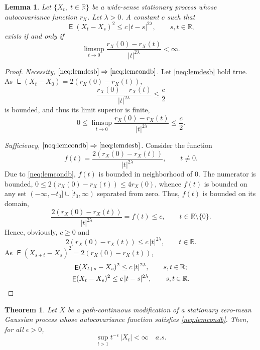 \documentclass{article}
\DeclareMathOperator{\ME}{\mathsf{E}}
\theoremstyle{plain}
\newtheorem{lemma}{Lemma}
\newtheorem{thm}{Theorem}
\begin{document}
\begin{lemma}\label{lem:uhbocond}
Let $\{X_t,\; t\in\mathbb{R}\}$
be a wide-sense stationary process whose
autocovariance function $r_X$.
Let $\lambda>0$.
A constant $c$ such that
\begin{equation}\label{neq:lemdesb}
\ME(X_t - X_s)^2 \le c \, |t-s|^{2\lambda},\qquad
s,t\mathbin{\in}\mathbb{R},
\end{equation}
exists if and only if
\begin{equation}\label{neq:lemcondb}
\limsup_{t\to 0}
\frac{r_X(0) - r_X(t)}{|t|^{2\lambda}} < \infty.
\end{equation}
\end{lemma}

\begin{proof}
\textit{Necessity, $\eqref{neq:lemdesb}\Rightarrow\eqref{neq:lemcondb}$.}
Let \eqref{neq:lemdesb} hold true.
As $\ME(X_t - X_0) = 2(r_X(0) - r_X(t))$,
\[
\frac{r_X(0) - r_X(t)}{|t|^{2\lambda}} \le \frac{c}{2}
\]
is bounded, and thus its limit superior is finite,
\[
0 \le \limsup_{t\to0}\frac{r_X(0) - r_X(t)}{|t|^{2\lambda}} \le \frac{c}{2}.
\]



\textit{Sufficiency, $\eqref{neq:lemcondb}\Rightarrow\eqref{neq:lemdesb}$.}
Consider the function
\[
f(t) = \frac{2 (r_X(0) - r_X(t))}{|t|^{2\lambda}} ,
\qquad t\mathbin{\neq}0 .
\]
Due to \eqref{neq:lemcondb}, $f(t)$
is bounded in neighborhood of $0$.
The numerator is bounded,
$0 \le 2 (r_X(0) - r_X(t)) \le 4 r_X(0)$,
whence $f(t)$ is bounded on any set
$(-\infty,-t_0]\cup[t_0,\infty)$
separated from zero.
Thus, $f(t)$ is bounded on its domain,
\[
\frac{2 (r_X(0) - r_X(t))}{|t|^{2\lambda}} = f(t) \le c,
\qquad t\in\mathbb{R}\setminus\{0\}.
\]
Hence, obviously, $c\ge 0$ and
\[
2 (r_X(0) - r_X(t)) \le c \, |t|^{2\lambda} , \qquad
t\mathbin{\in}\mathbb{R} .
\]
As $\ME(X_{s+t} - X_s)^2 = 2(r_X(0)-r_X(t))$,
\begin{gather*}
\ME(X_{t+s} - X_s)^2 \le c \, |t|^{2\lambda} , \qquad
s,t\mathbin{\in}\mathbb{R} ; \\
\ME(X_t - X_s)^2 \le c \, |t-s|^{2\lambda} , \qquad
s,t\mathbin{\in}\mathbb{R}.
\qedhere
\end{gather*}
\end{proof}


\begin{thm}\label{thm:useDozzi}
Let $X$ be a path-continuous modification
of a stationary zero-mean Gaussian process
whose autocovariance function
satisfies \eqref{neq:lemcondb}.
Then, for all $\epsilon>0$,
\[
\sup_{t>1} t^{-\epsilon} \, |X_t| < \infty
\quad
a.s.
\]
\end{thm}
\end{document}
